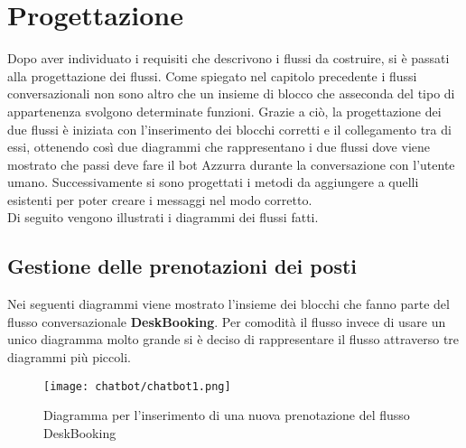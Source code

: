 \section{Progettazione}
Dopo aver individuato i requisiti che descrivono i flussi da costruire, si è passati alla progettazione dei flussi. Come spiegato nel capitolo precedente i flussi conversazionali non sono altro che un insieme di blocco che asseconda del tipo di appartenenza svolgono determinate funzioni. Grazie a ciò, la progettazione dei due flussi è iniziata con l'inserimento dei blocchi corretti e il collegamento tra di essi, ottenendo così due diagrammi che rappresentano i due flussi dove viene mostrato che passi deve fare il bot Azzurra durante la conversazione con l'utente umano. Successivamente si sono progettati i metodi da aggiungere a quelli esistenti per poter creare i messaggi nel modo corretto.\\
Di seguito vengono illustrati i diagrammi dei flussi fatti.

\subsection{Gestione delle prenotazioni dei posti}
Nei seguenti diagrammi viene mostrato l'insieme dei blocchi che fanno parte del flusso conversazionale \textbf{DeskBooking}. Per comodità il flusso invece di usare un unico diagramma molto grande si è deciso di rappresentare il flusso attraverso tre diagrammi più piccoli.

\begin{figure}[h]
	\centering
	\texttt{[image: chatbot/chatbot1.png]}
	\caption{Diagramma per l'inserimento di una nuova prenotazione del flusso DeskBooking}\label{fig:ins}
\end{figure}

